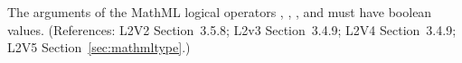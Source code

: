 The arguments of the MathML logical operators ,
, , and  must have boolean values.
(References: L2V2 Section~3.5.8; L2v3 Section~3.4.9; L2V4 Section~3.4.9; L2V5 
Section~\ref{sec:mathmltype}.)
